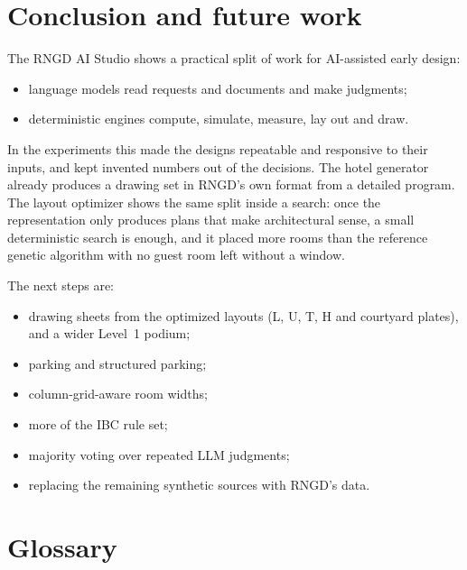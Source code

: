 \documentclass[10pt,a4paper]{article}
\theoremstyle{definition}
\begin{document}
\section{Conclusion and future work}
The RNGD AI Studio shows a practical split of work for AI-assisted early design:
\begin{itemize}
\item language models read requests and documents and make judgments;
\item deterministic engines compute, simulate, measure, lay out and draw.
\end{itemize}
In the experiments this made the designs repeatable and responsive to their inputs, and kept invented numbers out of the
decisions. The hotel generator already produces a drawing set in RNGD's own format from a detailed program. The
layout optimizer shows the same split inside a search: once the representation only produces plans that make
architectural sense, a small deterministic search is enough, and it placed more rooms than the reference genetic
algorithm with no guest room left without a window.

The next steps are:
\begin{itemize}
\item drawing sheets from the optimized layouts (L, U, T, H and courtyard plates), and a wider Level~1 podium;
\item parking and structured parking;
\item column-grid-aware room widths;
\item more of the IBC rule set;
\item majority voting over repeated LLM judgments;
\item replacing the remaining synthetic sources with RNGD's data.
\end{itemize}




\appendix
\section{Glossary}
\label{app:glossary}
\end{document}

